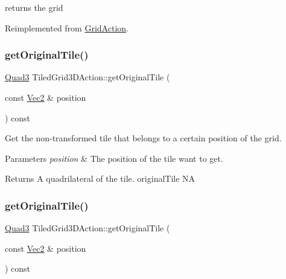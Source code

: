 returns the grid 

Reimplemented from \hyperlink{classGridAction_abb96dc546ce69541bd233b7c2f240add}{Grid\+Action}.

\mbox{\label{classTiledGrid3DAction_a4529b2fa5b1aafecad8537985c2d7d1b}} 
\subsubsection{\texorpdfstring{get\+Original\+Tile()}{getOriginalTile()}\hspace{0.1cm}{\footnotesize\ttfamily [1/2]}}
{\footnotesize\ttfamily \hyperlink{structQuad3}{Quad3} Tiled\+Grid3\+D\+Action\+::get\+Original\+Tile (\begin{DoxyParamCaption}\item[{const \hyperlink{classVec2}{Vec2} \&}]{position }\end{DoxyParamCaption}) const}



Get the non-\/transformed tile that belongs to a certain position of the grid. 


\begin{DoxyParams}{Parameters}
{\em position} & The position of the tile want to get. \\
\hline
\end{DoxyParams}
\begin{DoxyReturn}{Returns}
A quadrilateral of the tile.  original\+Tile  NA 
\end{DoxyReturn}
\mbox{\label{classTiledGrid3DAction_a4529b2fa5b1aafecad8537985c2d7d1b}} 
\subsubsection{\texorpdfstring{get\+Original\+Tile()}{getOriginalTile()}\hspace{0.1cm}{\footnotesize\ttfamily [2/2]}}
{\footnotesize\ttfamily \hyperlink{structQuad3}{Quad3} Tiled\+Grid3\+D\+Action\+::get\+Original\+Tile (\begin{DoxyParamCaption}\item[{const \hyperlink{classVec2}{Vec2} \&}]{position }\end{DoxyParamCaption}) const}




